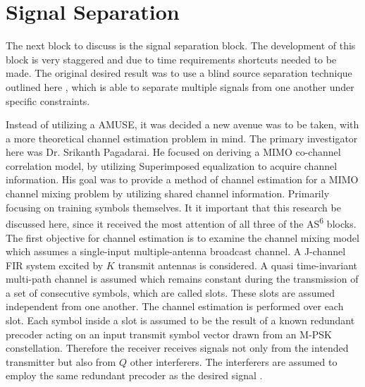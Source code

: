 \section{Signal Separation}

The next block to discuss is the signal separation block.  The development of this block is very staggered and due to time requirements shortcuts needed to be made.  The original desired result was to use a blind source separation technique outlined here \cite{AMUSE}, which is able to separate multiple signals from one another under specific constraints.  %

Instead of utilizing a AMUSE, it was decided a new avenue was to be taken, with a more theoretical channel estimation problem in mind.  The primary investigator here was Dr. Srikanth Pagadarai.  He focused on deriving a MIMO co-channel correlation model, by utilizing Superimposed equalization to acquire channel information.  His goal was to provide a method of channel estimation for a MIMO channel mixing problem by utilizing shared channel information.  Primarily focusing on training symbols themselves.  It it important that this research be discussed here, since it received the most attention of all three of the AS\textsuperscript{6} blocks.\\

The first objective for channel estimation is to examine the channel mixing model which assumes a single-input multiple-antenna broadcast channel.  A J-channel FIR system excited by \(K\) transmit antennas is considered. A quasi time-invariant multi-path channel is assumed which remains constant during the transmission of a set of consecutive symbols, which are called slots. These slots are assumed independent from one another.  The channel estimation is performed over each slot. Each symbol inside a slot is assumed to be the result of a known redundant precoder acting on an input transmit symbol vector drawn from an M-PSK constellation. Therefore the receiver receives signals not only from the intended transmitter but also from \(Q\) other interferers. The interferers are assumed to employ the same redundant precoder as the desired signal \cite{skrkantPHD}.\\

